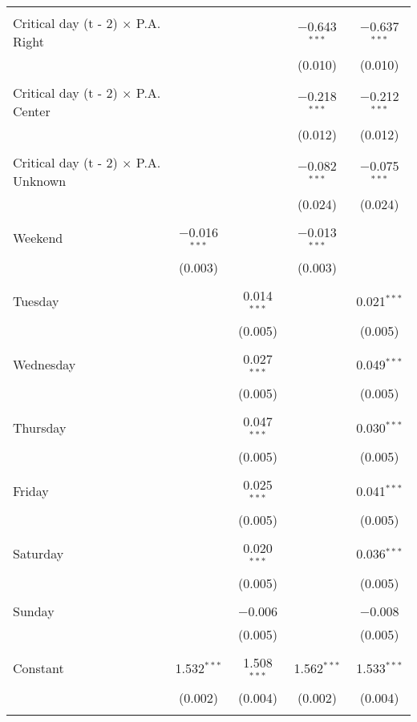\documentclass[
]{article}
\begin{document}
\begin{table}[!htbp]
{\begin{tabular}{@{\extracolsep{5pt}}lcccc}
  & & & & \\ 
 Critical day (t - 2) $\times$ P.A. Right &  &  & $-$0.643$^{***}$ & $-$0.637$^{***}$ \\ 
  &  &  & (0.010) & (0.010) \\ 
  & & & & \\ 
 Critical day (t - 2) $\times$ P.A. Center &  &  & $-$0.218$^{***}$ & $-$0.212$^{***}$ \\ 
  &  &  & (0.012) & (0.012) \\ 
  & & & & \\ 
 Critical day (t - 2) $\times$ P.A. Unknown &  &  & $-$0.082$^{***}$ & $-$0.075$^{***}$ \\ 
  &  &  & (0.024) & (0.024) \\ 
  & & & & \\ 
 Weekend & $-$0.016$^{***}$ &  & $-$0.013$^{***}$ &  \\ 
  & (0.003) &  & (0.003) &  \\ 
  & & & & \\ 
 Tuesday &  & 0.014$^{***}$ &  & 0.021$^{***}$ \\ 
  &  & (0.005) &  & (0.005) \\ 
  & & & & \\ 
 Wednesday &  & 0.027$^{***}$ &  & 0.049$^{***}$ \\ 
  &  & (0.005) &  & (0.005) \\ 
  & & & & \\ 
 Thursday &  & 0.047$^{***}$ &  & 0.030$^{***}$ \\ 
  &  & (0.005) &  & (0.005) \\ 
  & & & & \\ 
 Friday &  & 0.025$^{***}$ &  & 0.041$^{***}$ \\ 
  &  & (0.005) &  & (0.005) \\ 
  & & & & \\ 
 Saturday &  & 0.020$^{***}$ &  & 0.036$^{***}$ \\ 
  &  & (0.005) &  & (0.005) \\ 
  & & & & \\ 
 Sunday &  & $-$0.006 &  & $-$0.008 \\ 
  &  & (0.005) &  & (0.005) \\ 
  & & & & \\ 
 Constant & 1.532$^{***}$ & 1.508$^{***}$ & 1.562$^{***}$ & 1.533$^{***}$ \\ 
  & (0.002) & (0.004) & (0.002) & (0.004) \\ 
  & & & & \\ 

\end{tabular}}
\end{table}
\end{document}
